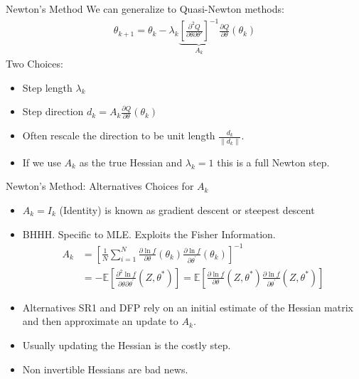 \documentclass[aspectratio=169]{beamer}
\newcommand{\norm}[1]{\left\lVert#1\right\rVert}
\begin{document}
\begin{frame}{Newton's Method}
We can generalize to Quasi-Newton methods:
\begin{align*}
\theta_{k+1} = \theta_k -  \lambda_k \underbrace{\left[ \frac{\partial^2 Q}{\partial \theta \partial \theta'} \right]^{-1}}_{A_k} \frac{\partial Q}{\partial \theta}(\theta_k)
\end{align*}
Two Choices:
\begin{itemize}
\item Step length $\lambda_k$
\item Step direction $d_k=A_k \frac{\partial Q}{\partial \theta}(\theta_k)$
\item Often rescale the direction to be unit length $\frac{d_k}{\norm{d_k}}$.
\item If we use $A_k$ as the true Hessian and $\lambda_k=1$ this is a \alert{full Newton step}.
\end{itemize}
\end{frame}

\begin{frame}{Newton's Method: Alternatives}
Choices for $A_k$
\begin{itemize}
\item $A_k= I_{k}$ (Identity) is known as \alert{gradient descent} or \alert{steepest descent}
\item BHHH. Specific to MLE. Exploits the \alert{Fisher Information}.
\begin{align*}
A _ { k } 
&= \left[ \frac { 1 } { N } \sum _ { i = 1 } ^ { N } \frac { \partial \ln f } { \partial \theta } \left( \theta _ { k } \right) \frac { \partial \ln f } { \partial \theta ^ { \prime } } \left( \theta _ { k } \right) \right] ^ { - 1 }\\
&=- \mathbb { E } \left[ \frac { \partial ^ { 2 } \ln f } { \partial \theta \partial \theta ^ { \prime } } \left( Z , \theta ^ { * } \right) \right] 
= \mathbb { E } \left[ \frac { \partial \ln f } { \partial \theta } \left( Z , \theta ^ { * } \right) \frac { \partial \ln f } { \partial \theta ^ { \prime } } \left( Z , \theta ^ { * } \right) \right]
\end{align*}
\item Alternatives \alert{SR1} and \alert{DFP} rely on an initial estimate of the Hessian matrix and then approximate an update to $A_k$.
\item Usually updating the Hessian is the costly step.
\item Non invertible Hessians are bad news.
\end{itemize}
\end{frame}
\end{document}
